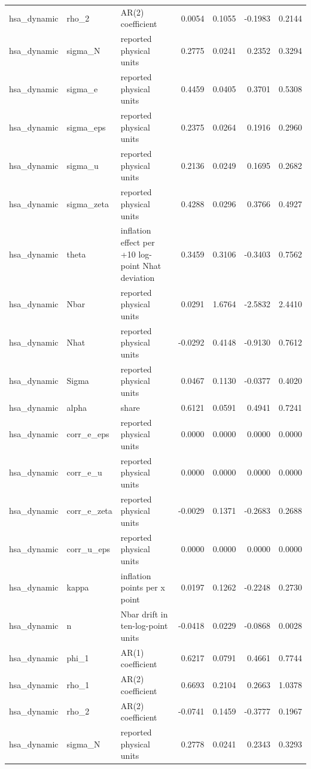 \begin{tabular}{lllrrrr}
hsa\_dynamic & rho\_2 & AR(2) coefficient & 0.0054 & 0.1055 & -0.1983 & 0.2144 \\
hsa\_dynamic & sigma\_N & reported physical units & 0.2775 & 0.0241 & 0.2352 & 0.3294 \\
hsa\_dynamic & sigma\_e & reported physical units & 0.4459 & 0.0405 & 0.3701 & 0.5308 \\
hsa\_dynamic & sigma\_eps & reported physical units & 0.2375 & 0.0264 & 0.1916 & 0.2960 \\
hsa\_dynamic & sigma\_u & reported physical units & 0.2136 & 0.0249 & 0.1695 & 0.2682 \\
hsa\_dynamic & sigma\_zeta & reported physical units & 0.4288 & 0.0296 & 0.3766 & 0.4927 \\
hsa\_dynamic & theta & inflation effect per +10 log-point Nhat deviation & 0.3459 & 0.3106 & -0.3403 & 0.7562 \\
hsa\_dynamic & Nbar & reported physical units & 0.0291 & 1.6764 & -2.5832 & 2.4410 \\
hsa\_dynamic & Nhat & reported physical units & -0.0292 & 0.4148 & -0.9130 & 0.7612 \\
hsa\_dynamic & Sigma & reported physical units & 0.0467 & 0.1130 & -0.0377 & 0.4020 \\
hsa\_dynamic & alpha & share & 0.6121 & 0.0591 & 0.4941 & 0.7241 \\
hsa\_dynamic & corr\_e\_eps & reported physical units & 0.0000 & 0.0000 & 0.0000 & 0.0000 \\
hsa\_dynamic & corr\_e\_u & reported physical units & 0.0000 & 0.0000 & 0.0000 & 0.0000 \\
hsa\_dynamic & corr\_e\_zeta & reported physical units & -0.0029 & 0.1371 & -0.2683 & 0.2688 \\
hsa\_dynamic & corr\_u\_eps & reported physical units & 0.0000 & 0.0000 & 0.0000 & 0.0000 \\
hsa\_dynamic & kappa & inflation points per x point & 0.0197 & 0.1262 & -0.2248 & 0.2730 \\
hsa\_dynamic & n & Nbar drift in ten-log-point units & -0.0418 & 0.0229 & -0.0868 & 0.0028 \\
hsa\_dynamic & phi\_1 & AR(1) coefficient & 0.6217 & 0.0791 & 0.4661 & 0.7744 \\
hsa\_dynamic & rho\_1 & AR(2) coefficient & 0.6693 & 0.2104 & 0.2663 & 1.0378 \\
hsa\_dynamic & rho\_2 & AR(2) coefficient & -0.0741 & 0.1459 & -0.3777 & 0.1967 \\
hsa\_dynamic & sigma\_N & reported physical units & 0.2778 & 0.0241 & 0.2343 & 0.3293 \\

\end{tabular}
